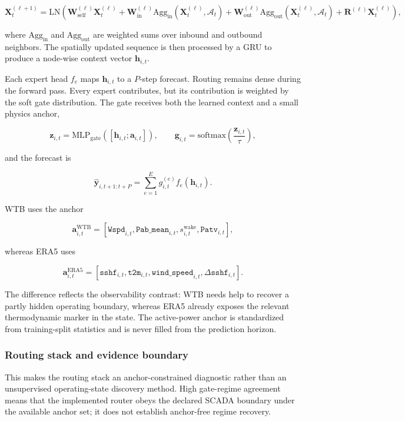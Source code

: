 \documentclass[
  11pt]{article}
\begin{document}
\[
\mathbf{X}^{(\ell+1)}_{t}
=
\mathrm{LN}\!\left(
\mathbf{W}_{\mathrm{self}}^{(\ell)}\mathbf{X}^{(\ell)}_{t}
+
\mathbf{W}_{\mathrm{in}}^{(\ell)}\mathrm{Agg}_{\mathrm{in}}(\mathbf{X}^{(\ell)}_{t},\mathcal{A}_t)
+
\mathbf{W}_{\mathrm{out}}^{(\ell)}\mathrm{Agg}_{\mathrm{out}}(\mathbf{X}^{(\ell)}_{t},\mathcal{A}_t)
+
\mathbf{R}^{(\ell)}\mathbf{X}^{(\ell)}_{t}
\right),
\]

where \(\mathrm{Agg}_{\mathrm{in}}\) and \(\mathrm{Agg}_{\mathrm{out}}\)
are weighted sums over inbound and outbound neighbors. The spatially
updated sequence is then processed by a GRU to produce a node-wise
context vector \(\mathbf{h}_{i,t}\).

Each expert head \(f_e\) maps \(\mathbf{h}_{i,t}\) to a \(P\)-step
forecast. Routing remains dense during the forward pass. Every expert
contributes, but its contribution is weighted by the soft gate
distribution. The gate receives both the learned context and a small
physics anchor,

\[
\mathbf{z}_{i,t}
=
\mathrm{MLP}_{\mathrm{gate}}\!\left(
\left[\mathbf{h}_{i,t};\mathbf{a}_{i,t}\right]
\right),
\qquad
\mathbf{g}_{i,t} = \mathrm{softmax}\!\left(\frac{\mathbf{z}_{i,t}}{\tau}\right),
\]

and the forecast is

\[
\hat{\mathbf{y}}_{i,t+1:t+P}
=
\sum_{e=1}^{E} g_{i,t}^{(e)} f_e(\mathbf{h}_{i,t}).
\]

WTB uses the anchor

\[
\mathbf{a}_{i,t}^{\mathrm{WTB}}
=
[\texttt{Wspd}_{i,t}, \texttt{Pab\_mean}_{i,t}, s^{\mathrm{wake}}_{i,t}, \texttt{Patv}_{i,t}],
\]

whereas ERA5 uses

\[
\mathbf{a}_{i,t}^{\mathrm{ERA5}}
=
[\texttt{sshf}_{i,t}, \texttt{t2m}_{i,t}, \texttt{wind\_speed}_{i,t}, \Delta \texttt{sshf}_{i,t}].
\]

The difference reflects the observability contrast: WTB needs help to
recover a partly hidden operating boundary, whereas ERA5 already exposes
the relevant thermodynamic marker in the state. The active-power anchor
is standardized from training-split statistics and is never filled from
the prediction horizon.

\subsubsection{Routing stack and evidence
boundary}\label{routing-stack-and-evidence-boundary}

This makes the routing stack an anchor-constrained diagnostic rather
than an unsupervised operating-state discovery method. High gate-regime
agreement means that the implemented router obeys the declared SCADA
boundary under the available anchor set; it does not establish
anchor-free regime recovery.
\end{document}

